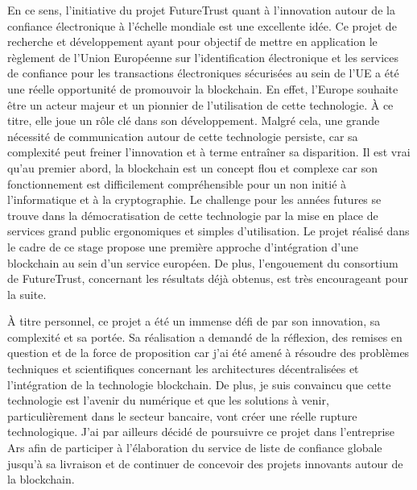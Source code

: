 \documentclass{tnreport}
\begin{document}
En ce sens, l’initiative du projet FutureTrust quant à l'innovation autour de la confiance électronique à l'échelle mondiale est une excellente idée. 
Ce projet de recherche et développement ayant pour objectif de mettre en application le règlement de l'Union Européenne sur l'identification électronique et les services de confiance pour les transactions électroniques sécurisées au sein de l'UE a été une réelle opportunité de promouvoir la blockchain.
En effet, l'Europe souhaite être un acteur majeur et un pionnier de l'utilisation de cette technologie. À ce titre, elle joue un rôle clé dans son développement.
Malgré cela, une grande nécessité de communication autour de cette technologie persiste, car sa complexité peut freiner l'innovation et à terme entraîner sa disparition.
Il est vrai qu'au premier abord, la blockchain est un concept flou et complexe car son fonctionnement est difficilement compréhensible pour un non initié à l'informatique et à la cryptographie.
Le challenge pour les années futures se trouve dans la démocratisation de cette technologie par la mise en place de services grand public ergonomiques et simples d'utilisation.
Le projet réalisé dans le cadre de ce stage propose une première approche d'intégration d'une blockchain au sein d'un service européen. De plus, l'engouement du consortium de FutureTrust, concernant les résultats déjà obtenus, est très encourageant pour la suite.

À titre personnel, ce projet a été un immense défi de par son innovation, sa complexité et sa portée. Sa réalisation a demandé de la réflexion, des remises en question et de la force de proposition car j'ai été amené à résoudre des problèmes techniques et scientifiques concernant les architectures décentralisées et l'intégration de la technologie blockchain.
De plus, je suis convaincu que cette technologie est l’avenir du numérique et que les solutions à venir, particulièrement dans le secteur bancaire, vont créer une réelle rupture technologique.
J’ai par ailleurs décidé de poursuivre ce projet dans l'entreprise Ar{\texteta}s afin de participer à l'élaboration du service de liste de confiance globale jusqu'à sa livraison et de continuer de concevoir des projets innovants autour de la blockchain.

\cleardoublepage
\renewcommand{\tocbibname}{Bibliographie / Webographie}


\listoffigures

\lstlistoflistings
\end{document}
